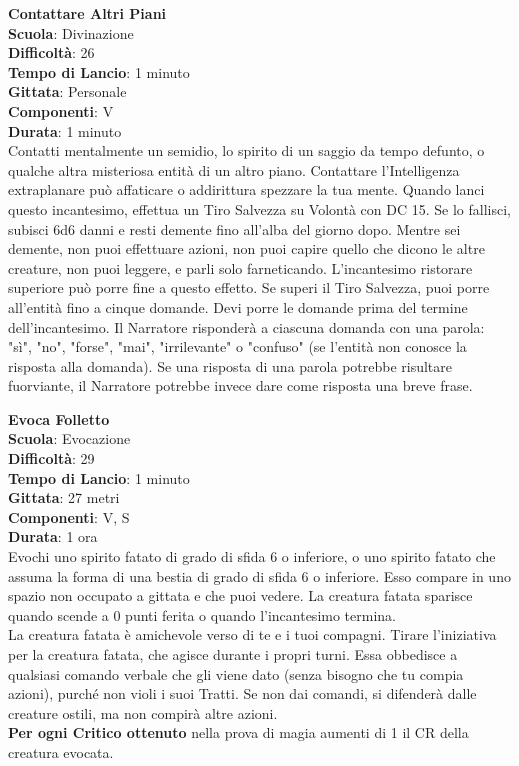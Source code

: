 \begin{multicols}{2}
\medskip\textbf{Contattare Altri Piani}\\
\textbf{Scuola}: Divinazione\\
\textbf{Difficoltà}: 26\\
\textbf{Tempo di Lancio}: 1 minuto\\
\textbf{Gittata}: Personale\\
\textbf{Componenti}: V\\
\textbf{Durata}: 1 minuto\\
Contatti mentalmente un semidio, lo spirito di un saggio da tempo defunto, o qualche altra misteriosa entità di un altro piano. Contattare l'Intelligenza extraplanare può affaticare o addirittura spezzare la tua mente. Quando lanci questo incantesimo, effettua un Tiro Salvezza su Volontà con DC 15. Se lo fallisci, subisci 6d6 danni e resti demente fino all'alba del giorno dopo. Mentre sei demente, non puoi effettuare azioni, non puoi capire quello che dicono le altre creature, non puoi leggere, e parli solo farneticando. L'incantesimo ristorare superiore può porre fine a questo effetto. Se superi il Tiro Salvezza, puoi porre all'entità fino a cinque domande. Devi porre le domande prima del termine dell'incantesimo. Il Narratore risponderà a ciascuna domanda con una parola: "sì", "no", "forse", "mai", "irrilevante" o "confuso" (se l'entità non conosce la risposta alla domanda). Se una risposta di una parola potrebbe risultare fuorviante, il Narratore potrebbe invece dare come risposta una breve frase.
	
\medskip\textbf{Evoca Folletto}\\
\textbf{Scuola}: Evocazione\\
\textbf{Difficoltà}: 29\\
\textbf{Tempo di Lancio}: 1 minuto\\
\textbf{Gittata}: 27 metri\\
\textbf{Componenti}: V, S\\
\textbf{Durata}: 1 ora \\
Evochi uno spirito fatato di grado di sfida 6 o inferiore, o uno spirito fatato che assuma la forma di una bestia di grado di sfida 6 o inferiore. Esso compare in uno spazio non occupato a gittata e che puoi vedere. La creatura fatata sparisce quando scende a 0 punti ferita o quando l'incantesimo termina.\\
La creatura fatata è amichevole verso di te e i tuoi compagni. Tirare l'iniziativa per la creatura fatata, che agisce durante i propri turni. Essa obbedisce a qualsiasi comando verbale che gli viene dato (senza bisogno che tu compia azioni), purché non violi i suoi Tratti. Se non dai comandi, si difenderà dalle creature ostili, ma non compirà altre azioni.\\
\textbf{Per ogni Critico ottenuto} nella prova di magia aumenti di 1 il CR della creatura evocata.


\end{multicols}
